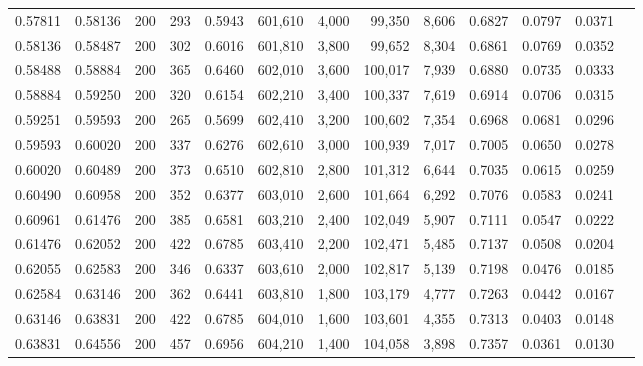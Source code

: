\begin{tabular}{rrrrrrrrrrrrr}
0.57811 & 0.58136 &    200 & 293 &                                     0.5943 & 601,610 &   4,000 &  99,350 &   8,606 & 0.6827 & 0.0797 & 0.0371 \\
0.58136 & 0.58487 &    200 & 302 &                                     0.6016 & 601,810 &   3,800 &  99,652 &   8,304 & 0.6861 & 0.0769 & 0.0352 \\
0.58488 & 0.58884 &    200 & 365 &                                     0.6460 & 602,010 &   3,600 & 100,017 &   7,939 & 0.6880 & 0.0735 & 0.0333 \\
0.58884 & 0.59250 &    200 & 320 &                                     0.6154 & 602,210 &   3,400 & 100,337 &   7,619 & 0.6914 & 0.0706 & 0.0315 \\
0.59251 & 0.59593 &    200 & 265 &                                     0.5699 & 602,410 &   3,200 & 100,602 &   7,354 & 0.6968 & 0.0681 & 0.0296 \\
0.59593 & 0.60020 &    200 & 337 &                                     0.6276 & 602,610 &   3,000 & 100,939 &   7,017 & 0.7005 & 0.0650 & 0.0278 \\
0.60020 & 0.60489 &    200 & 373 &                                     0.6510 & 602,810 &   2,800 & 101,312 &   6,644 & 0.7035 & 0.0615 & 0.0259 \\
0.60490 & 0.60958 &    200 & 352 &                                     0.6377 & 603,010 &   2,600 & 101,664 &   6,292 & 0.7076 & 0.0583 & 0.0241 \\
0.60961 & 0.61476 &    200 & 385 &                                     0.6581 & 603,210 &   2,400 & 102,049 &   5,907 & 0.7111 & 0.0547 & 0.0222 \\
0.61476 & 0.62052 &    200 & 422 &                                     0.6785 & 603,410 &   2,200 & 102,471 &   5,485 & 0.7137 & 0.0508 & 0.0204 \\
0.62055 & 0.62583 &    200 & 346 &                                     0.6337 & 603,610 &   2,000 & 102,817 &   5,139 & 0.7198 & 0.0476 & 0.0185 \\
0.62584 & 0.63146 &    200 & 362 &                                     0.6441 & 603,810 &   1,800 & 103,179 &   4,777 & 0.7263 & 0.0442 & 0.0167 \\
0.63146 & 0.63831 &    200 & 422 &                                     0.6785 & 604,010 &   1,600 & 103,601 &   4,355 & 0.7313 & 0.0403 & 0.0148 \\
0.63831 & 0.64556 &    200 & 457 &                                     0.6956 & 604,210 &   1,400 & 104,058 &   3,898 & 0.7357 & 0.0361 & 0.0130 \\

\end{tabular}
